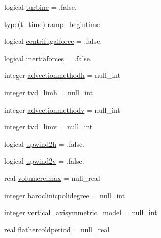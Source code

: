 \begin{DoxyCompactItemize}
\item 
logical \mbox{\hyperlink{structmodulehydrodynamic_1_1t__hydrooptions_ad426ee38250963d4c0228ba6d18a2754}{turbine}} = .false.
\item 
type(t\+\_\+time) \mbox{\hyperlink{structmodulehydrodynamic_1_1t__hydrooptions_abf564b45d8b13cc286fe452382c499e0}{ramp\+\_\+begintime}}
\item 
logical \mbox{\hyperlink{structmodulehydrodynamic_1_1t__hydrooptions_af826d5a80fcd417a461d74197658f70c}{centrifugalforce}} = .false.
\item 
logical \mbox{\hyperlink{structmodulehydrodynamic_1_1t__hydrooptions_abfe10ed5062d1ead21001a6b09a98e23}{inertiaforces}} = .false.
\item 
integer \mbox{\hyperlink{structmodulehydrodynamic_1_1t__hydrooptions_a11d668915273778c7e28d5024813f1e5}{advectionmethodh}} = null\+\_\+int
\item 
integer \mbox{\hyperlink{structmodulehydrodynamic_1_1t__hydrooptions_af3ba0a672229d44e2b3f6ecc54a925f9}{tvd\+\_\+limh}} = null\+\_\+int
\item 
integer \mbox{\hyperlink{structmodulehydrodynamic_1_1t__hydrooptions_aad2604d98128dff51d890cc3043be863}{advectionmethodv}} = null\+\_\+int
\item 
integer \mbox{\hyperlink{structmodulehydrodynamic_1_1t__hydrooptions_a38bf66cfeb7b8ebf653a0909b56cede6}{tvd\+\_\+limv}} = null\+\_\+int
\item 
logical \mbox{\hyperlink{structmodulehydrodynamic_1_1t__hydrooptions_ad50ce961617131385ec7d8129801cb8b}{upwind2h}} = .false.
\item 
logical \mbox{\hyperlink{structmodulehydrodynamic_1_1t__hydrooptions_a6852d1a938a70c0e2f38d0d7063e6ff3}{upwind2v}} = .false.
\item 
real \mbox{\hyperlink{structmodulehydrodynamic_1_1t__hydrooptions_a87ef4e0f710314129d07e47986d08e45}{volumerelmax}} = null\+\_\+real
\item 
integer \mbox{\hyperlink{structmodulehydrodynamic_1_1t__hydrooptions_adb985191b6299b71e6a7b624673577ab}{baroclinicpolidegree}} = null\+\_\+int
\item 
integer \mbox{\hyperlink{structmodulehydrodynamic_1_1t__hydrooptions_aef1befbce944ec2765d5dbcba107d1cc}{vertical\+\_\+axisymmetric\+\_\+model}} = null\+\_\+int
\item 
real \mbox{\hyperlink{structmodulehydrodynamic_1_1t__hydrooptions_a9a390e4345e950ced294a23f3244908e}{flathercoldperiod}} = null\+\_\+real
\item 

\end{DoxyCompactItemize}
